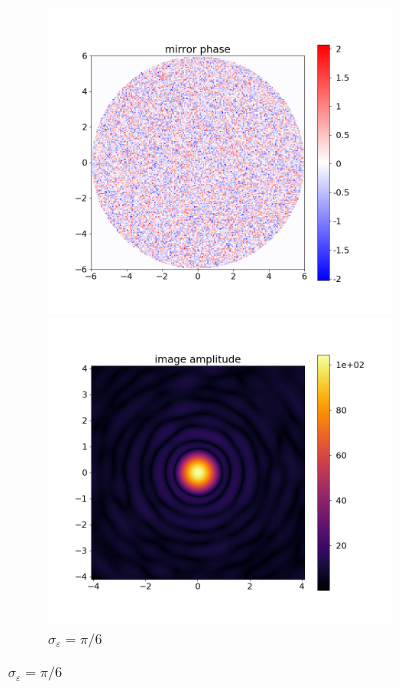 \documentclass[11pt]{article}
\newcommand{\eps}{\varepsilon}
\begin{document}
\begin{figure}
    \centering
    \begin{subfigure}{\textwidth}
        \begin{minipage}{0.5\textwidth}
            \includegraphics[width=\textwidth]{pictures/error_pics/errors0in_phase.png}
        \end{minipage}%
        \hfill
        \begin{minipage}{0.5\textwidth}
            \includegraphics[width=\textwidth]{pictures/error_pics/errors0out_abs.png}
        \end{minipage}
        \caption{$\sigma_{\eps} = \pi/6$}\label{fig:randpic:1}
    \end{subfigure}


\end{figure}
\end{document}
